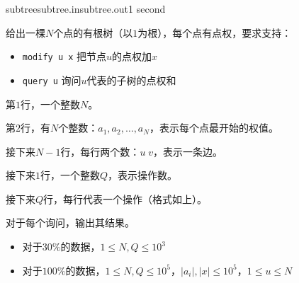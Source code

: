\documentclass[11pt,a4paper,oneside]{article}
\begin{document}
\begin{problem}{subtree}{subtree.in}{subtree.out}{1 second} 
	
	给出一棵$N$个点的有根树（以$1$为根），每个点有点权，要求支持：
	
	\begin{itemize}
		\item \texttt{modify u x} 把节点$u$的点权加$x$
		\item \texttt{query u} 询问$u$代表的子树的点权和
	\end{itemize}
	
	\InputFile

	第$1$行，一个整数$N$。
	
	第$2$行，有$N$个整数：$a_1,a_2,\dots,a_N$，表示每个点最开始的权值。
	
	接下来$N-1$行，每行两个数：$u \; v$，表示一条边。
	
	接下来$1$行，一个整数$Q$，表示操作数。
	
	接下来$Q$行，每行代表一个操作（格式如上）。
	
	\OutputFile
	
	对于每个询问，输出其结果。
	
	\Example
	
	\begin{example}
\end{example}

\Note

\begin{itemize}
	\item 对于$30\%$的数据，$1 \leq N, Q \leq 10^3$
	\item 对于$100\%$的数据，$ 1 \leq N, Q \leq 10^5$，$|a_i| , | x | \leq 10^5 $，$ 1 \leq u \leq N $
\end{itemize}

\end{problem}
\end{document}
